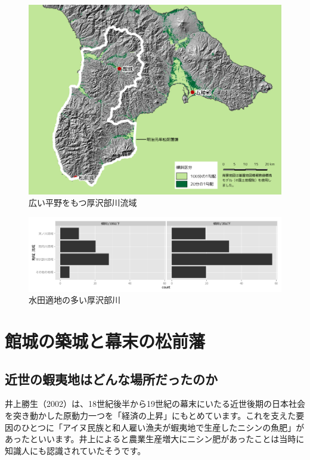 \documentclass[11pt,report]{jsbook}
\begin{document}
\begin{figure}[h]
\centering
\includegraphics[width=160truemm]{fig/04slope.pdf}
\caption{広い平野をもつ厚沢部川流域}
\label{fig04}
\end{figure}

\begin{figure}[h]
\centering
\includegraphics[width=160truemm]{fig/03suiden.pdf}
\caption{水田適地の多い厚沢部川}
\label{fig03}
\end{figure}

\newpage
\chapter{館城の築城と幕末の松前藩}
\section{近世の蝦夷地はどんな場所だったのか}
井上勝生（2002）は、18世紀後半から19世紀の幕末にいたる近世後期の日本社会を突き動かした原動力一つを「経済の上昇」にもとめています。これを支えた要因のひとつに「アイヌ民族と和人雇い漁夫が蝦夷地で生産したニシンの魚肥」があったといいます。井上によると農業生産増大にニシン肥があったことは当時に知識人にも認識されていたそうです。
\end{document}

